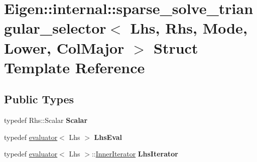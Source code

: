 \hypertarget{struct_eigen_1_1internal_1_1sparse__solve__triangular__selector_3_01_lhs_00_01_rhs_00_01_mode_00_01_lower_00_01_col_major_01_4}{}\section{Eigen\+::internal\+::sparse\+\_\+solve\+\_\+triangular\+\_\+selector$<$ Lhs, Rhs, Mode, Lower, Col\+Major $>$ Struct Template Reference}
\label{struct_eigen_1_1internal_1_1sparse__solve__triangular__selector_3_01_lhs_00_01_rhs_00_01_mode_00_01_lower_00_01_col_major_01_4}
\subsection*{Public Types}
\begin{DoxyCompactItemize}
\item 
\mbox{\label{struct_eigen_1_1internal_1_1sparse__solve__triangular__selector_3_01_lhs_00_01_rhs_00_01_mode_00_01_lower_00_01_col_major_01_4_affb7775e1066d61d30e4b282daceb9ae}} 
typedef Rhs\+::\+Scalar {\bfseries Scalar}
\item 
\mbox{\label{struct_eigen_1_1internal_1_1sparse__solve__triangular__selector_3_01_lhs_00_01_rhs_00_01_mode_00_01_lower_00_01_col_major_01_4_a9efac27dba275a92290b70aa04ea4069}} 
typedef \mbox{\hyperlink{struct_eigen_1_1internal_1_1evaluator}{evaluator}}$<$ Lhs $>$ {\bfseries Lhs\+Eval}
\item 
\mbox{\label{struct_eigen_1_1internal_1_1sparse__solve__triangular__selector_3_01_lhs_00_01_rhs_00_01_mode_00_01_lower_00_01_col_major_01_4_a7549d5428a9dd12f909976122cce18af}} 
typedef \mbox{\hyperlink{struct_eigen_1_1internal_1_1evaluator}{evaluator}}$<$ Lhs $>$\+::\mbox{\hyperlink{class_eigen_1_1_inner_iterator}{Inner\+Iterator}} {\bfseries Lhs\+Iterator}
\end{DoxyCompactItemize}
